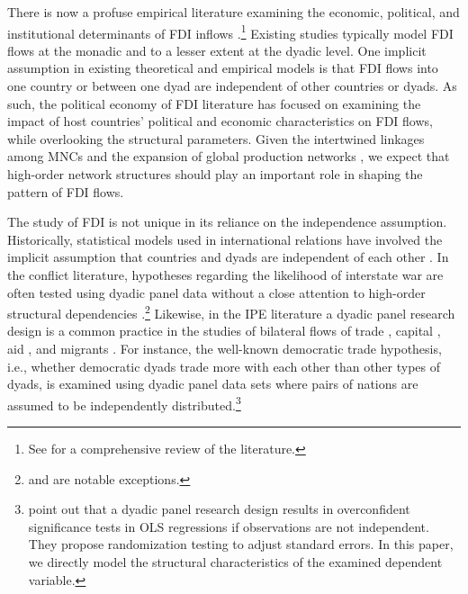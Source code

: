 \documentclass[reqno,onecolumn,letterpaper,12pt]{article}
\begin{document}
There is now a profuse empirical literature examining the economic, political, and institutional determinants of FDI inflows \citep[e.g.,][]{Noorbakhsh_et_al:2001,Yeaple:2003,Jensen:2003,Li_Resnick:2003,Buthe_Milner:2008,Li_Vashchilko:2010,Kerner:2009,Wright_Zhu:2017,Pinto_Pinto:2008,Pinto:2013}.\footnote{See \citet{Pandya:2016} for a comprehensive review of the literature.} Existing studies typically model FDI flows at the monadic and to a lesser extent at the dyadic level. One implicit assumption in existing theoretical and empirical models is that FDI flows into one country or between one dyad are independent of other countries or dyads. As such, the political economy of FDI literature has focused on examining the impact of host countries' political and economic characteristics on FDI flows, while overlooking the structural parameters. Given the intertwined linkages among MNCs and the expansion of global production networks \citep{UNCTAD:2013}, we expect that high-order network structures should play an important role in shaping the pattern of FDI flows.


The study of FDI is not unique in its reliance on the independence assumption. Historically, statistical models used in international relations have involved the implicit assumption that countries and dyads are independent of each other \citep{diehl2016conditional,ward2007persistent}. In the conflict literature, hypotheses regarding the likelihood of interstate war are often tested using dyadic panel data without a close attention to high-order structural dependencies \citep[e.g.,][]{Cranmer_Desmarais:2011}.\footnote{\citet{ward2007disputes} and \citet{ward2007persistent} are notable exceptions.} Likewise, in the IPE literature a dyadic panel research design is a common practice in the studies of bilateral flows of trade \citep[e.g.,][]{Mansfield_et_al:2000,Rose:2004,Goldstein_et_al:2007,Bliss_Russett:1998,Gowa_Mansfield:1993}, capital \citep[e.g.,][]{Li_Vashchilko:2010,Leblang:2010,Egger_Pfaffermayr:2004}, aid \citep[e.g.,][]{BDM_Smith:2009}, and migrants \citep[e.g.,][]{Fitzgerald_et_al:2014}. For instance, the well-known democratic trade hypothesis, i.e., whether democratic dyads trade more with each other than other types of dyads, is examined using dyadic panel data sets where pairs of nations are assumed to be independently distributed.\footnote{\citet{Erikson_et_al:2014} point out that a dyadic panel research design results in overconfident significance tests in OLS regressions if observations are not independent. They propose randomization testing to adjust standard errors. In this paper, we directly model the structural characteristics of the examined dependent variable. }
\end{document}
